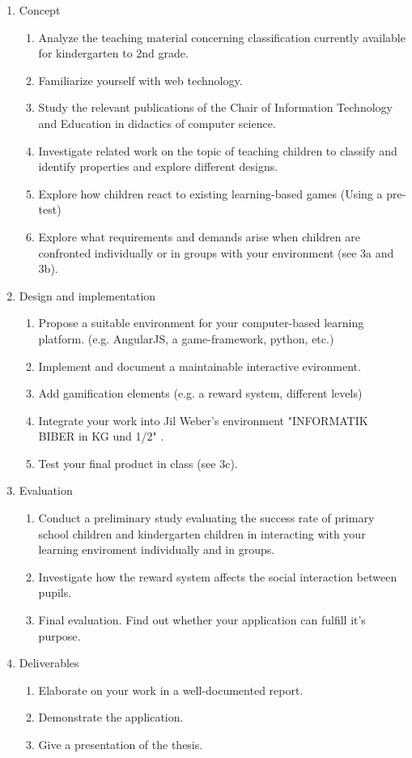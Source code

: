 \documentclass[a4paper,oneside,11pt,final]{scrartcl}
\begin{document}
\begin{enumerate}
	\item Concept
	\begin{enumerate}
		\item Analyze the teaching material concerning classification currently
		available for kindergarten to 2nd grade. 
		\item Familiarize yourself with web technology.
		\item Study the relevant publications of the Chair of Information
		Technology and Education in didactics of computer science.
		\item Investigate related work on the topic of teaching children to
		classify and identify properties and explore different designs. 
		\item Explore how children react to existing learning-based games (Using
		a pre-test)
		\item Explore what requirements and demands arise when children are
		confronted individually or in groups with your environment (see 3a and
		3b). 
	\end{enumerate}
	
	\item Design and implementation
	\begin{enumerate}
		\item Propose a suitable environment for your computer-based learning
		platform. (e.g. AngularJS, a game-framework, python, etc.)
		\item Implement and document a maintainable interactive evironment.
		\item Add gamification elements (e.g. a reward system, different levels)
		\item Integrate your work into Jil Weber's environment "INFORMATIK BIBER
		in KG und 1/2" \cite{JWEBER}.
		\item Test your final product in class (see 3c).
	\end{enumerate}
	
	\item Evaluation
	\begin{enumerate}
		\item Conduct a preliminary study evaluating the success rate of primary
		school children and kindergarten children in interacting with your
		learning enviroment individually and in groups. 
		\item Investigate how the reward system affects the social interaction
		between pupils.
		\item Final evaluation. Find out whether your application can fulfill
		it's purpose.
		
	\end{enumerate}
	
	\item Deliverables
	\begin{enumerate}
		\item Elaborate on your work in a well-documented report.
		\item Demonstrate the application.
		\item Give a presentation of the thesis.
	\end{enumerate}
\end{enumerate}
\end{document}
